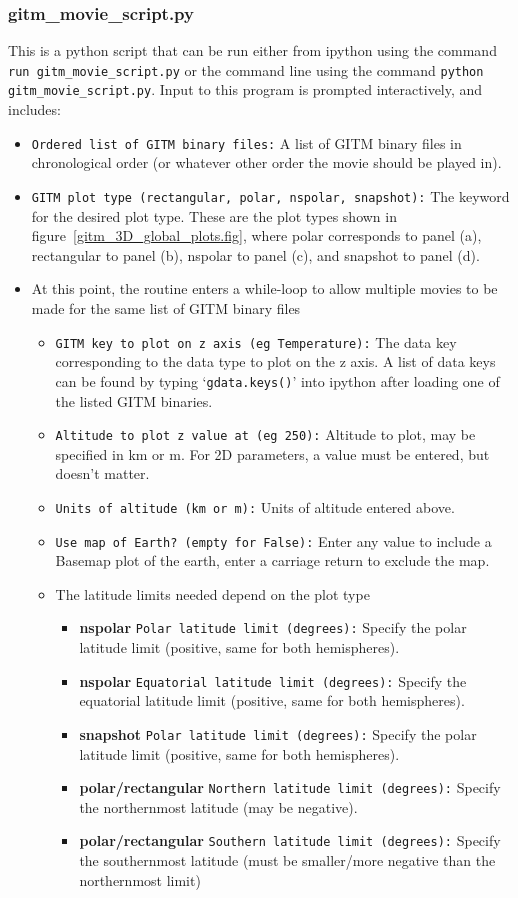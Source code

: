 \subsubsection{gitm\_movie\_script.py}

This is a python script that can be run either from ipython using the command {\tt run gitm\_movie\_script.py} or the command line using the command {\tt python gitm\_movie\_script.py}.  Input to this program is prompted interactively, and includes:

\begin{itemize}
\item{{\tt Ordered list of GITM binary files:}  A list of GITM binary files in chronological order (or whatever other order the movie should be played in).}
\item{{\tt GITM plot type (rectangular, polar, nspolar, snapshot):}  The keyword for the desired plot type.  These are the plot types shown in figure~\ref{gitm_3D_global_plots.fig}, where polar corresponds to panel (a), rectangular to panel (b), nspolar to panel (c), and snapshot to panel (d).}
\item{At this point, the routine enters a while-loop to allow multiple movies to be made for the same list of GITM binary files}
	\begin{itemize}
	\item{{\tt GITM key to plot on z axis (eg Temperature):} The data key corresponding to the data type to plot on the z axis.  A list of data keys can be found by typing `{\tt gdata.keys()}' into ipython after loading one of the listed GITM binaries.}
	\item{{\tt Altitude to plot z value at (eg 250):} Altitude to plot, may be specified in km or m.  For 2D parameters, a value must be entered, but doesn't matter.}
	\item{{\tt Units of altitude (km or m):} Units of altitude entered above.}
	\item{{\tt Use map of Earth? (empty for False):} Enter any value to include a Basemap plot of the earth, enter a carriage return to exclude the map.}
	\item{The latitude limits needed depend on the plot type}
		\begin{itemize}
		\item{{\bf nspolar}  {\tt Polar latitude limit (degrees):} Specify the polar latitude limit (positive, same for both hemispheres).}
		\item{{\bf nspolar} {\tt Equatorial latitude limit (degrees):} Specify the equatorial latitude limit (positive, same for both hemispheres).}
		\item{{\bf snapshot} {\tt Polar latitude limit (degrees):} Specify the polar latitude limit (positive, same for both hemispheres).}
		\item{{\bf polar/rectangular} {\tt Northern latitude limit (degrees):} Specify the northernmost latitude (may be negative).}
     	   	\item{{\bf polar/rectangular} {\tt Southern latitude limit (degrees):} Specify the southernmost latitude (must be smaller/more negative than the northernmost limit)}
		\end{itemize}
		

\end{itemize}
\end{itemize}
